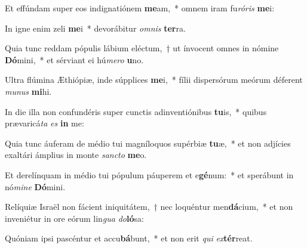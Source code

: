 \item Et effúndam super eos indignatiónem \textbf{me}am,~* omnem iram fu\textit{ró}\textit{ris} \textbf{me}i:
\item In igne enim zeli \textbf{me}i~* devorábitur \textit{om}\textit{nis} \textbf{ter}ra.
\item Quia tunc reddam pópulis lábium eléctum,~† ut ínvocent omnes in nómine \textbf{Dó}mini,~* et sérviant ei hú\textit{me}\textit{ro} \textbf{u}no.
\item Ultra flúmina Æthiópiæ, inde súpplices \textbf{me}i,~* fílii dispersórum meórum déferent \textit{mu}\textit{nus} \textbf{mi}hi.
\item In die illa non confundéris super cunctis adinventiónibus \textbf{tu}is,~* quibus prævaricá\textit{ta} \textit{es} \textbf{in} me:
\item Quia tunc áuferam de médio tui magníloquos supérbiæ \textbf{tu}æ,~* et non adjícies exaltári ámplius in monte \textit{sanc}\textit{to} \textbf{me}o.
\item Et derelínquam in médio tui pópulum páuperem et e\textbf{gé}num:~* et sperábunt in nó\textit{mi}\textit{ne} \textbf{Dó}mini.
\item Relíquiæ Israël non fácient iniquitátem,~† nec loquéntur men\textbf{dá}cium,~* et non inveniétur in ore eórum lin\textit{gua} \textit{do}\textbf{ló}sa:
\item Quóniam ipsi pascéntur et accu\textbf{bá}bunt,~* et non erit \textit{qui} \textit{ex}\textbf{tér}reat.
